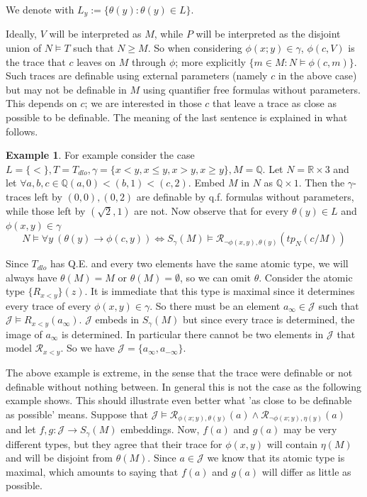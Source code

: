 \documentclass[11pt,a4paper]{article}
\theoremstyle{plain}
\theoremstyle{definition}
\newtheorem{example}[theorem]{Example}
\begin{document}
We denote with $L_y := \{\theta(y) : \theta(y) \in L\}$.

Ideally, $V$ will be interpreted as $M$, while $P$ will be interpreted as the disjoint union of $N \models T$ such that $N \geq M$.
So when considering $\phi(x;y) \in \gamma$, $\phi(c,V)$ is the trace that $c$ leaves on $M$ through $\phi$; more explicitly $\{m \in M : N \models \phi(c,m)\}$.
Such traces are definable using external parameters (namely $c$ in the above case) but may not be definable in $M$ using quantifier free formulas without parameters.
This depends on $c$; we are interested in those $c$ that leave a trace as close as possible to be definable.
The meaning of the last sentence is explained in what follows.

\begin{example}\label{ex:uno}
For example consider the case $L = \{<\}, T = T_{dlo}, \gamma = \{x < y, x \leq y, x > y, x \geq y\}, M = \mathbb{Q}$.
Let $N=\mathbb{R} \times 3$ and let $\forall a,b,c \in \mathbb{Q} (a,0) < (b,1) < (c,2)$.
Embed $M$ in $N$ as $\mathbb{Q} \times {1}$. Then the $\gamma$-traces left by $(0,0),(0,2)$ are definable by q.f. formulas without parameters, while those left by $(\sqrt{2},1)$ are not.
Now observe that for every $\theta(y) \in L$ and $\phi(x,y) \in \gamma$ 
\[
	N \models \forall y \ (\theta(y) \to \phi(c,y)) \iff S_{\gamma}(M) \models \mathcal{R}_{\neg \phi(x,y),\theta(y)}(tp_N(c/M))
\]

Since $T_{dlo}$ has Q.E. and every two elements have the same atomic type, we will always have $\theta(M) = M$ or $\theta(M) = \emptyset$, so we can omit $\theta$.
Consider the atomic type $\{R_{x < y}\}(z)$. It is immediate that this type is maximal since it determines every trace of every $\phi(x,y) \in \gamma$.
So there must be an element $a_{\infty} \in \mathcal{J}$ such that $\mathcal{J} \models R_{x < y}(a_{\infty})$.
$\mathcal{J}$ embeds in $S_{\gamma}(M)$ but since every trace is determined, the image of $a_{\infty}$ is determined.
In particular there cannot be two elements in $\mathcal{J}$ that model $\mathcal{R}_{x < y}$.
So we have $\mathcal{J} = \{a_{\infty}, a_{-\infty}\}$.

\end{example}

The above example is extreme, in the sense that the trace were definable or not definable without nothing between. 
In general this is not the case as the following example shows. This should illustrate even better what 'as close to be definable as possible' means.
Suppose that $\mathcal{J} \models \mathcal{R}_{\phi(x;y),\theta(y)}(a) \land \mathcal{R}_{\neg \phi(x;y), \eta(y)}(a)$ and let $f,g: \mathcal{J} \to S_{\gamma}(M)$ embeddings.
Now, $f(a)$ and $g(a)$ may be very different types, but they agree that their trace for $\phi(x,y)$ will contain $\eta(M)$ and will be disjoint from $\theta(M)$.
Since $a \in \mathcal{J}$ we know that its atomic type is maximal, which amounts to saying that $f(a)$ and $g(a)$ will differ as little as possible.
\end{document}
